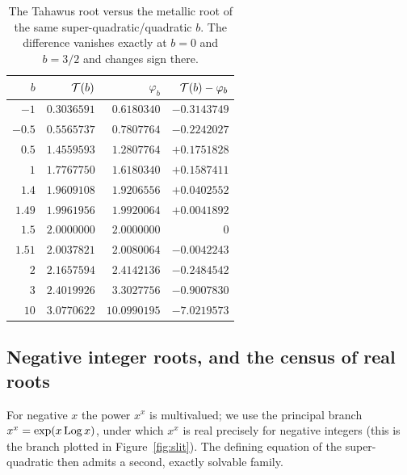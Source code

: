 \begin{table}[t]
\centering
\small
\caption{The Tahawus root versus the metallic root of the same
super-quadratic/quadratic $b$. The difference vanishes exactly at
$b = 0$ and $b = 3/2$ and changes sign there.}
\label{tab:golden}
\begin{tabular}{rrrr}
\toprule
$b$ & $\mathcal{T}(b)$ & $\varphi_b$ & $\mathcal{T}(b) - \varphi_b$ \\
\midrule
$-1$    & $0.3036591$  & $0.6180340$  & $-0.3143749$ \\
$-0.5$  & $0.5565737$  & $0.7807764$  & $-0.2242027$ \\
$0.5$   & $1.4559593$  & $1.2807764$  & $+0.1751828$ \\
$1$     & $1.7767750$  & $1.6180340$  & $+0.1587411$ \\
$1.4$   & $1.9609108$  & $1.9206556$  & $+0.0402552$ \\
$1.49$  & $1.9961956$  & $1.9920064$  & $+0.0041892$ \\
$1.5$   & $2.0000000$  & $2.0000000$  & $0$ \\
$1.51$  & $2.0037821$  & $2.0080064$  & $-0.0042243$ \\
$2$     & $2.1657594$  & $2.4142136$  & $-0.2484542$ \\
$3$     & $2.4019926$  & $3.3027756$  & $-0.9007830$ \\
$10$    & $3.0770622$  & $10.0990195$ & $-7.0219573$ \\
\bottomrule
\end{tabular}
\end{table}

\subsection{Negative integer roots, and the census of real roots}
\label{subsec:negative}

For negative $x$ the power $x^{x}$ is multivalued; we use the
principal branch $x^{x} = \exp(x \operatorname{Log} x)$, under which $x^{x}$ is real
precisely for negative integers (this is the branch plotted in
Figure~\ref{fig:slit}). The defining equation of the super-quadratic
then admits a second, exactly solvable family.

